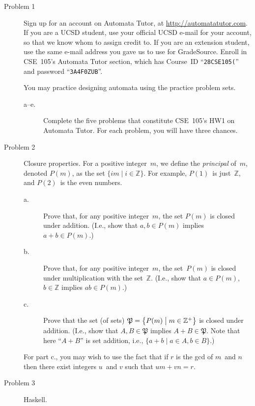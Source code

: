 \documentclass[letterpaper,12pt]{article}
\newcommand{\Z}{\mathbb{Z}}
\begin{document}
\newlength{\boxwidth}
\setlength{\boxwidth}{\textwidth}
\addtolength{\boxwidth}{-2cm}
\noindent{}
\vspace{0.7cm}

\begin{description}

\item[Problem 1] Sign up for an account on Automata Tutor, at
  \url{http://automatatutor.com}.  If you are a UCSD student, use your
  official UCSD e-mail for your account, so that we know whom to
  assign credit to.  If you are an extension student, use the same
  e-mail address you gave us to use for GradeSource.  Enroll in
  CSE~105's Automata Tutor section, which has Course~ID
  ``\texttt{28CSE105(}'' and password ``\texttt{3A4F0ZUB}''.

  You may practice designing automata using the practice problem
  sets.

  \begin{description}
  \item[a--e.] Complete the five problems that constitute CSE~105's
    HW1 on Automata Tutor.  For each problem, you will have three
    chances.
  \end{description}

\item[Problem 2] Closure properties.
  For a positive integer~$m$, we define the \emph{principal} of~$m$,
  denoted $P(m)$, as the set $\{im \mid i \in \Z\}$.  For example,
  $P(1)$~is just~$\Z$, and $P(2)$~is the even numbers.
  \begin{description}
  \item[a.] Prove that, for any positive integer~$m$, the set $P(m)$
    is closed under addition.  (I.e., show that $a,b \in P(m)$ implies
    $a+b \in P(m)$.)
  \item[b.] Prove that, for any positive integer~$m$, the set~$P(m)$
    is closed under multiplication with the set~$\Z$.  (I.e., show
    that $a \in P(m)$, $b \in \Z$ implies $ab \in P(m)$.)
  \item[c.] Prove that the set (of sets) $\mathfrak{P} = \bigl\{ P(m)
    \bigm| m \in \Z^+ \bigr\}$ is closed under addition.  (I.e., show
    that $A, B \in \mathfrak{P}$ implies $A+B \in \mathfrak{P}$.  Note
    that here ``$A+B$'' is set addition, i.e., $\{a+b \mid a \in A, b
    \in B \}$.)
  \end{description}
  For part c., you may wish to use the fact that if $r$ is the gcd of
  $m$~and $n$ then there exist integers $u$~and $v$ such that $um + vn
  = r$.
\item[Problem 3] Haskell.


\end{description}
\end{document}
